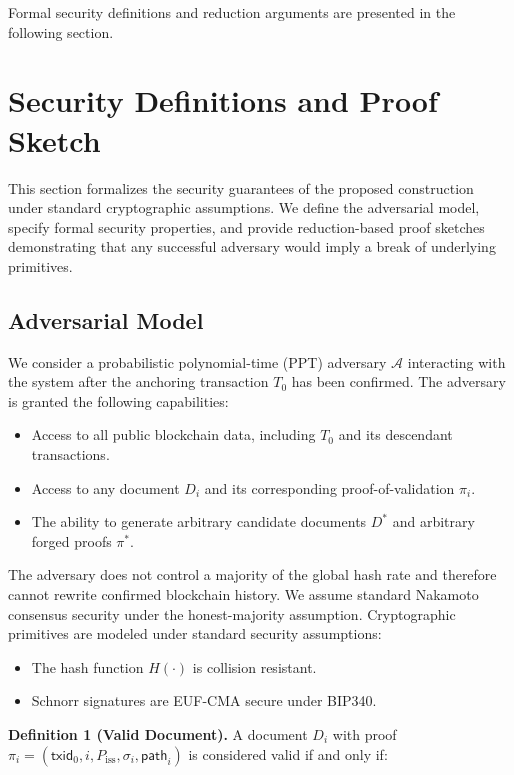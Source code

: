 \documentclass[preprint,12pt]{elsarticle}
\begin{document}
Formal security definitions and reduction arguments are presented in the following section.



\section{Security Definitions and Proof Sketch}
\label{sec:security}

This section formalizes the security guarantees of the proposed construction under standard cryptographic assumptions. We define the adversarial model, specify formal security properties, and provide reduction-based proof sketches demonstrating that any successful adversary would imply a break of underlying primitives.

\subsection{Adversarial Model}

We consider a probabilistic polynomial-time (PPT) adversary $\mathcal{A}$ interacting with the system after the anchoring transaction $T_0$ has been confirmed. The adversary is granted the following capabilities:

\begin{itemize}
    \item Access to all public blockchain data, including $T_0$ and its descendant transactions.
    \item Access to any document $D_i$ and its corresponding proof-of-validation $\pi_i$.
    \item The ability to generate arbitrary candidate documents $D^*$ and arbitrary forged proofs $\pi^*$.
\end{itemize}

The adversary does not control a majority of the global hash rate and therefore cannot rewrite confirmed blockchain history. We assume standard Nakamoto consensus security under the honest-majority assumption. Cryptographic primitives are modeled under standard security assumptions:

\begin{itemize}
    \item The hash function $H(\cdot)$ is collision resistant.
    \item Schnorr signatures are EUF-CMA secure under BIP340.
\end{itemize}

\textbf{Definition 1 (Valid Document).}  
A document $D_i$ with proof $\pi_i = (\mathsf{txid}_0, i, P_{\mathrm{iss}}, \sigma_i, \mathsf{path}_i)$ is considered valid if and only if:
\end{document}
